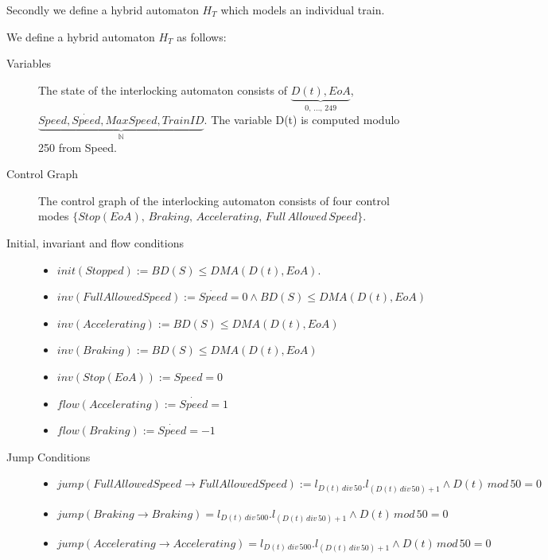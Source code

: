 Secondly we define a hybrid automaton $H_{T}$ which models an individual train. 
\medskip
\begin{mydef}

We define a hybrid automaton $H_{T}$ as follows:
\begin{description}
\item[Variables] The state of the interlocking automaton consists of $\underbrace{D(t), EoA}_\text{0, \ldots , 249}$, \newline $\underbrace{Speed, \dot{Speed}, MaxSpeed, TrainID}_{\mathbb{N}}$. The variable D(t) is computed modulo 250 from Speed.

\item[Control Graph] The control graph of the interlocking automaton consists of four control modes $\{Stop (EoA), \, Braking, \, Accelerating, \, Full \, Allowed \, Speed \}$.

\item[Initial, invariant and flow conditions] \hspace*{0mm}
	\begin{itemize}
	\item $init(Stopped) :=   BD(S) \leq DMA(D(t),EoA)  $.

	\item $inv(Full Allowed Speed) :=   \dot{Speed} = 0 \wedge BD(S) \leq DMA(D(t),EoA)$ 

	\item $inv(Accelerating) := BD(S) \leq DMA(D(t),EoA)$

	\item $inv(Braking)  := BD(S) \leq DMA(D(t),EoA)$
	
	\item $inv(Stop (EoA)) := Speed = 0$ 
             
	\item $flow(Accelerating):= \dot{Speed} = 1$ 
	
	\item $flow(Braking) := \dot{Speed} = -1$
 
  
	
	\end{itemize}

\item[Jump Conditions] \hspace*{0mm}

	\begin{itemize}
	\item $jump(Full Allowed Speed \to Full Allowed Speed) := l_{D(t) \, div \, 50}.l_{(D(t) \, div \, 50) +1} \wedge D(t) \, mod \, 50 = 0$
\item $jump(Braking \to Braking) = l_{D(t) \, div \, 500}.l_{(D(t) \, div \, 50) +1} \wedge D(t) \, mod \, 50 = 0$
\item $jump(Accelerating \to Accelerating) = l_{D(t) \, div \, 500}.l_{(D(t) \, div \, 50) +1} \wedge D(t) \, mod \, 50 = 0$


\end{itemize}
\end{description}
\end{mydef}
